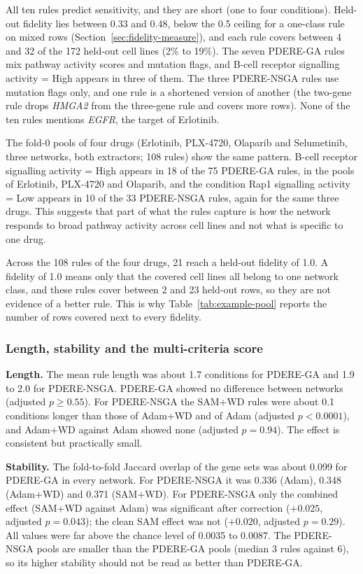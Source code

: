 All ten rules predict sensitivity, and they are short (one to four conditions). Held-out fidelity lies between 0.33 and 0.48, below the 0.5 ceiling for a one-class rule on mixed rows (Section~\ref{sec:fidelity-measure}), and each rule covers between 4 and 32 of the 172 held-out cell lines (2\% to 19\%). The seven PDERE-GA rules mix pathway activity scores and mutation flags, and B-cell receptor signalling activity = High appears in three of them. The three PDERE-NSGA rules use mutation flags only, and one rule is a shortened version of another (the two-gene rule drops \textit{HMGA2} from the three-gene rule and covers more rows). None of the ten rules mentions \textit{EGFR}, the target of Erlotinib.

The fold-0 pools of four drugs (Erlotinib, PLX-4720, Olaparib and Selumetinib, three networks, both extractors; 108 rules) show the same pattern. B-cell receptor signalling activity = High appears in 18 of the 75 PDERE-GA rules, in the pools of Erlotinib, PLX-4720 and Olaparib, and the condition Rap1 signalling activity = Low appears in 10 of the 33 PDERE-NSGA rules, again for the same three drugs. This suggests that part of what the rules capture is how the network responds to broad pathway activity across cell lines and not what is specific to one drug.

Across the 108 rules of the four drugs, 21 reach a held-out fidelity of 1.0. A fidelity of 1.0 means only that the covered cell lines all belong to one network class, and these rules cover between 2 and 23 held-out rows, so they are not evidence of a better rule. This is why Table~\ref{tab:example-pool} reports the number of rows covered next to every fidelity.

\subsubsection{Length, stability and the multi-criteria score}
\label{sec:length-stability}

\textbf{Length.} The mean rule length was about 1.7 conditions for PDERE-GA and 1.9 to 2.0 for PDERE-NSGA. PDERE-GA showed no difference between networks (adjusted $p \ge 0.55$). For PDERE-NSGA the SAM+WD rules were about 0.1 conditions longer than those of Adam+WD and of Adam (adjusted $p < 0.0001$), and Adam+WD against Adam showed none (adjusted $p = 0.94$). The effect is consistent but practically small.

\textbf{Stability.} The fold-to-fold Jaccard overlap of the gene sets was about 0.099 for PDERE-GA in every network. For PDERE-NSGA it was 0.336 (Adam), 0.348 (Adam+WD) and 0.371 (SAM+WD). For PDERE-NSGA only the combined effect (SAM+WD against Adam) was significant after correction ($+0.025$, adjusted $p = 0.043$); the clean SAM effect was not ($+0.020$, adjusted $p = 0.29$). All values were far above the chance level of 0.0035 to 0.0087. The PDERE-NSGA pools are smaller than the PDERE-GA pools (median 3 rules against 6), so its higher stability should not be read as better than PDERE-GA.

